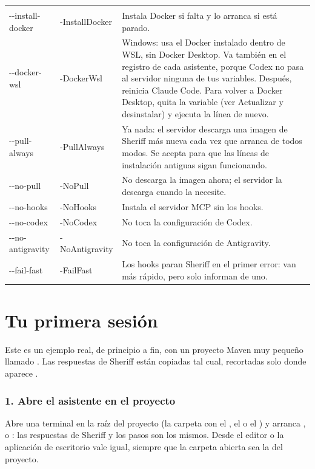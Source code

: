 \documentclass[11pt,a4paper]{article}
\begin{document}
\begin{center}
\begin{tabularx}{\linewidth}{@{\hspace{6pt}}>{\ttfamily\small}p{31mm}>{\ttfamily\small}p{26mm}L}
\headrow {} &  &  \\
-{}-install-docker & -InstallDocker & Instala Docker si falta y lo arranca si
  está parado. \\
-{}-docker-wsl & -DockerWsl & Windows: usa el Docker instalado dentro de WSL, sin Docker
  Desktop. Va también en el registro de cada asistente, porque Codex no pasa al
  servidor ninguna de tus variables. Después, reinicia Claude Code. Para volver
  a Docker Desktop, quita la variable (ver Actualizar y desinstalar) y ejecuta la línea de
  nuevo. \\
-{}-pull-always & -PullAlways & Ya nada: el servidor descarga una imagen de
  Sheriff más nueva cada vez que arranca de todos modos. Se acepta para que las
  líneas de instalación antiguas sigan funcionando. \\
-{}-no-pull & -NoPull & No descarga la imagen ahora; el servidor la descarga
  cuando la necesite. \\
-{}-no-hooks & -NoHooks & Instala el servidor MCP sin los hooks. \\
-{}-no-codex & -NoCodex & No toca la configuración de Codex. \\
-{}-no-antigravity & -NoAntigravity & No toca la configuración de Antigravity. \\
-{}-fail-fast & -FailFast & Los hooks paran Sheriff en el primer error: van más
  rápido, pero solo informan de uno. \\
\end{tabularx}
\end{center}

\section{Tu primera sesión}
\label{sec:primera}

Este es un ejemplo real, de principio a fin, con un proyecto Maven muy pequeño
llamado . Las respuestas de Sheriff están copiadas tal cual,
recortadas solo donde aparece \code{[...]}.

\subsubsection{1. Abre el asistente en el proyecto}
Abre una terminal en la raíz del proyecto (la carpeta con el ,
el  o el ) y arranca ,  o
: las respuestas de Sheriff y los pasos son los mismos. Desde el
editor o la aplicación de escritorio vale igual, siempre que la carpeta abierta
sea la del proyecto.
\end{document}
